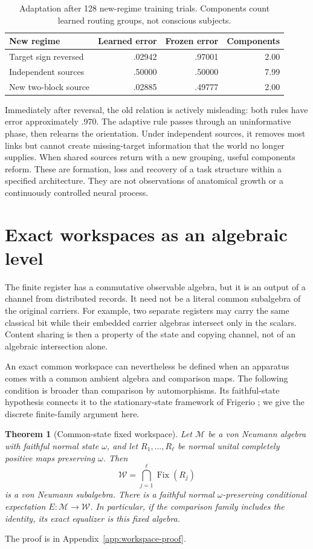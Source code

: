 \documentclass[11pt]{article}
\newtheorem{theorem}{Theorem}[section]
\theoremstyle{definition}
\theoremstyle{remark}
\newcommand{\W}{\mathcal W}
\newcommand{\M}{\mathcal M}
\newcommand{\Fix}{\operatorname{Fix}}
\begin{document}
\begin{table}[ht]
\centering
\caption{Adaptation after 128 new-regime training trials. Components count learned routing groups, not conscious subjects.}
\label{tab:dynamic}
\begin{tabular}{lrrr}
\toprule
New regime & Learned error & Frozen error & Components\\
\midrule
Target sign reversed & .02942 & .97001 & 2.00\\
Independent sources & .50000 & .50000 & 7.99\\
New two-block source & .02885 & .49777 & 2.00\\
\bottomrule
\end{tabular}
\end{table}

Immediately after reversal, the old relation is actively misleading: both rules have error approximately .970. The adaptive rule passes through an uninformative phase, then relearns the orientation. Under independent sources, it removes most links but cannot create missing-target information that the world no longer supplies. When shared sources return with a new grouping, useful components reform. These are formation, loss and recovery of a task structure within a specified architecture. They are not observations of anatomical growth or a continuously controlled neural process.

\section{Exact workspaces as an algebraic level}
\label{sec:algebra}

The finite register has a commutative observable algebra, but it is an output of a channel from distributed records. It need not be a literal common subalgebra of the original carriers. For example, two separate registers may carry the same classical bit while their embedded carrier algebras intersect only in the scalars. Content sharing is then a property of the state and copying channel, not of an algebraic intersection alone.

An exact common workspace can nevertheless be defined when an apparatus comes with a common ambient algebra and comparison maps. The following condition is broader than comparison by automorphisms. Its faithful-state hypothesis connects it to the stationary-state framework of Frigerio \cite{Frigerio1978}; we give the discrete finite-family argument here.

\begin{theorem}[Common-state fixed workspace]
\label{thm:ucp}
Let $\M$ be a von Neumann algebra with faithful normal state $\omega$, and let $R_1,\ldots,R_\ell$ be normal unital completely positive maps preserving $\omega$. Then
\begin{equation}
 \W=\bigcap_{j=1}^{\ell}\Fix(R_j)
\end{equation}
is a von Neumann subalgebra. There is a faithful normal $\omega$-preserving conditional expectation $E:\M\to\W$. In particular, if the comparison family includes the identity, its exact equalizer is this fixed algebra.
\end{theorem}
The proof is in Appendix~\ref{app:workspace-proof}.
\end{document}
